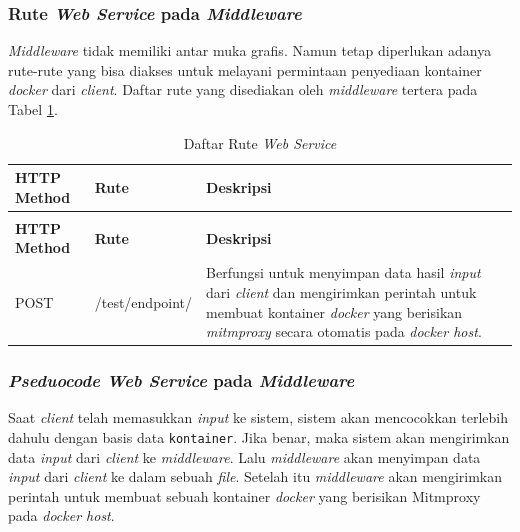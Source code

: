 \subsubsection{Rute \textit{Web Service} pada \textit{Middleware}}
\textit{Middleware} tidak memiliki antar muka grafis. Namun tetap diperlukan adanya rute-rute yang bisa diakses untuk melayani permintaan penyediaan kontainer \textit{docker} dari \textit{client}. Daftar rute yang disediakan oleh \textit{middleware} tertera pada Tabel \ref{tabelRuteWebServiceDockerHost}.\\
\begin{longtable}{|p{}|p{}|p{}|p{}|} %
	
	\caption{Daftar Rute \textit{Web Service}} \label{tabelRuteWebServiceDockerHost} \\
	\hline
	\textbf{HTTP Method} & \textbf{Rute} & \textbf{Deskripsi} \\ \hline
	
	\endfirsthead
	\caption[]{Daftar Rute \textit{Web Service}}  \\
	\hline
	\textbf{HTTP Method} & \textbf{Rute} & \textbf{Deskripsi}  \\ \hline
	
	\endhead
	\endfoot
	\endlastfoot
	
	POST & /test/endpoint/ & Berfungsi untuk menyimpan data hasil \textit{input} dari \textit{client} dan mengirimkan perintah untuk membuat kontainer \textit{docker} yang berisikan \textit{mitmproxy} secara otomatis pada \textit{docker host}.\\ \hline
\end{longtable}

\subsubsection{\textit{Pseduocode Web Service} pada \textit{Middleware}}
Saat \textit{client} telah memasukkan \textit{input} ke sistem, sistem akan mencocokkan terlebih dahulu dengan basis data \texttt{kontainer}. Jika benar, maka sistem akan mengirimkan data \textit{input} dari \textit{client} ke \textit{middleware}. Lalu \textit{middleware} akan menyimpan data \textit{input} dari \textit{client} ke dalam sebuah \textit{file}. Setelah itu \textit{middleware} akan mengirimkan perintah untuk membuat sebuah kontainer \textit{docker} yang berisikan Mitmproxy pada \textit{docker host}.

